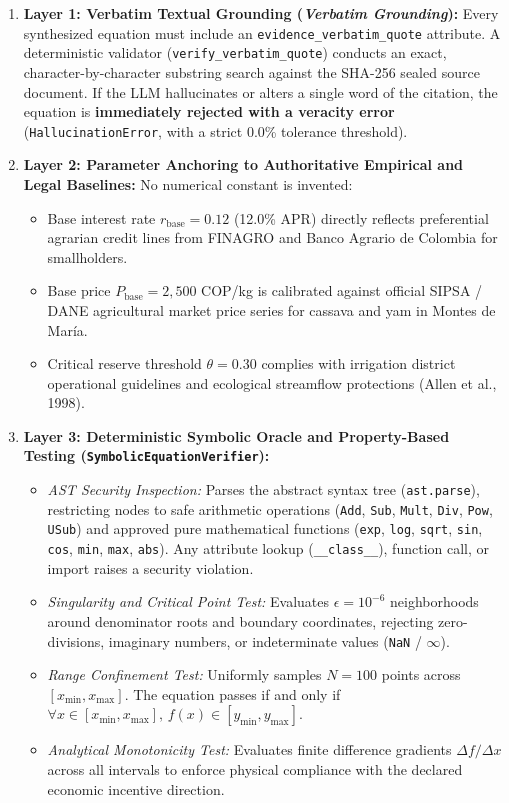 \documentclass[11pt,a4paper]{article}
\begin{document}
\begin{enumerate}[leftmargin=*]
    \item \textbf{Layer 1: Verbatim Textual Grounding (\textit{Verbatim Grounding}):}
    Every synthesized equation must include an \texttt{evidence\_verbatim\_quote} attribute. A deterministic validator (\texttt{verify\_verbatim\_quote}) conducts an exact, character-by-character substring search against the SHA-256 sealed source document. If the LLM hallucinates or alters a single word of the citation, the equation is \textbf{immediately rejected with a veracity error} (\texttt{HallucinationError}, with a strict 0.0\% tolerance threshold).

    \item \textbf{Layer 2: Parameter Anchoring to Authoritative Empirical and Legal Baselines:}
    No numerical constant is invented:
    \begin{itemize}
        \item Base interest rate $r_{\text{base}} = 0.12$ (12.0\% APR) directly reflects preferential agrarian credit lines from FINAGRO and Banco Agrario de Colombia for smallholders.
        \item Base price $P_{\text{base}} = 2,500$ COP/kg is calibrated against official SIPSA / DANE agricultural market price series for cassava and yam in Montes de Mar\'ia.
        \item Critical reserve threshold $\theta = 0.30$ complies with irrigation district operational guidelines and ecological streamflow protections (Allen et al., 1998).
    \end{itemize}

    \item \textbf{Layer 3: Deterministic Symbolic Oracle and Property-Based Testing (\texttt{SymbolicEquationVerifier}):}
    \begin{itemize}
        \item \textit{AST Security Inspection:} Parses the abstract syntax tree (\texttt{ast.parse}), restricting nodes to safe arithmetic operations (\texttt{Add}, \texttt{Sub}, \texttt{Mult}, \texttt{Div}, \texttt{Pow}, \texttt{USub}) and approved pure mathematical functions (\texttt{exp}, \texttt{log}, \texttt{sqrt}, \texttt{sin}, \texttt{cos}, \texttt{min}, \texttt{max}, \texttt{abs}). Any attribute lookup (\texttt{\_\_class\_\_}), function call, or import raises a security violation.
        \item \textit{Singularity and Critical Point Test:} Evaluates $\epsilon = 10^{-6}$ neighborhoods around denominator roots and boundary coordinates, rejecting zero-divisions, imaginary numbers, or indeterminate values (\texttt{NaN} / $\infty$).
        \item \textit{Range Confinement Test:} Uniformly samples $N=100$ points across $[x_{\min}, x_{\max}]$. The equation passes if and only if $\forall x \in [x_{\min}, x_{\max}], \, f(x) \in [y_{\min}, y_{\max}]$.
        \item \textit{Analytical Monotonicity Test:} Evaluates finite difference gradients $\Delta f / \Delta x$ across all intervals to enforce physical compliance with the declared economic incentive direction.
    \end{itemize}


\end{enumerate}
\end{document}
